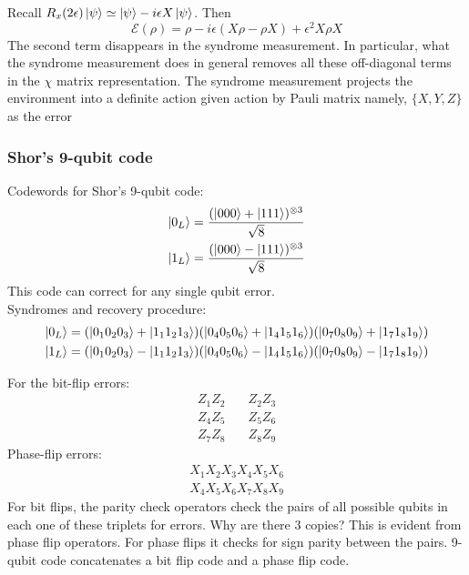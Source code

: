 \begin{example}
    Recall $R_x(2\epsilon) \ket{\psi} \simeq \ket{\psi} - i \epsilon X \ket{\psi}$. Then 
    \begin{equation}
        \mathcal{E}(\rho) = \rho - i\epsilon(X\rho - \rho X) + \epsilon^2 X\rho X
    \end{equation}
    The second term disappears in the syndrome measurement. In particular, what the syndrome measurement does in general removes all these off-diagonal terms in the $\chi$ matrix representation. The syndrome measurement projects the environment into a definite action given action by Pauli matrix namely, $\{X,Y,Z\}$ as the error
\end{example}


\subsubsection{Shor's 9-qubit code}
Codewords for Shor's 9-qubit code:
\begin{align}
    \ket{0_L} & = \frac{(\ket{000} + \ket{111})^{\otimes 3}}{\sqrt{8}} \\
    \ket{1_L} & = \frac{(\ket{000} - \ket{111})^{\otimes 3}}{\sqrt{8}}
\end{align}
This code can correct for any single qubit error. \\
Syndromes and recovery procedure:
\begin{align}
    \ket{0_L} & = (\ket{0_10_20_3} + \ket{1_11_21_3})(\ket{0_40_50_6} + \ket{1_41_51_6})(\ket{0_70_80_9} + \ket{1_71_81_9}) \\
    \ket{1_L} & = (\ket{0_10_20_3} - \ket{1_11_21_3})(\ket{0_40_50_6} - \ket{1_41_51_6})(\ket{0_70_80_9} - \ket{1_71_81_9}) 
\end{align}

For the bit-flip errors: 
\begin{align}
    Z_1Z_2 &\quad Z_2Z_3\\ 
    Z_4Z_5 &\quad Z_5Z_6\\ 
    Z_7Z_8 &\quad Z_8Z_9 
\end{align}
Phase-flip errors:
\begin{align}
    X_1X_2X_3X_4X_5X_6 \\
    X_4X_5X_6X_7X_8X_9
\end{align}
For bit flips, the parity check operators check the pairs of all possible qubits in each one of these triplets for errors. Why are there 3 copies? This is evident from phase flip operators. For phase flips it checks for sign parity between the pairs. 9-qubit code concatenates a bit flip code and a phase flip code. \\

